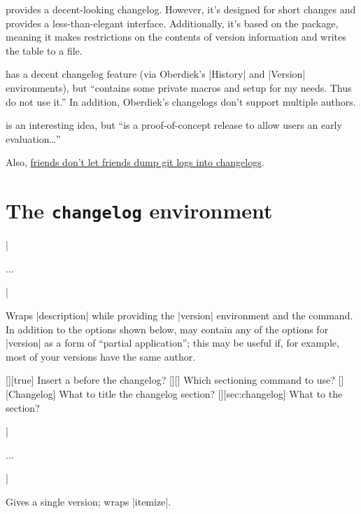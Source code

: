 \documentclass{ltxguidex}
\begin{document}
\begin{ctandescription}
	 provides a decent-looking changelog. However, it's
		designed for short changes and provides a less-than-elegant
		interface. Additionally, it's based on the 
		package, meaning it makes restrictions on the contents of
		version information and writes the table to a file.

	 has a decent changelog feature (via
		Oberdiek's |History| and |Version| environments),
		but  ``contains some private macros and setup
		for my needs. Thus do not use it.'' In addition, Oberdiek's
		changelogs don't support multiple authors.

	 is an interesting idea, but  ``is a
		proof-of-concept release to allow users an early
		evaluation\dots''

		Also,
		\href{https://keepachangelog.com/en/1.0.0/}{friends don't
		let friends dump git logs into changelogs}.
\end{ctandescription}

\section{The \texttt{changelog} environment}

\begin{desc}
|\begin{changelog}[<options>]...\end{changelog}|
\end{desc}
Wraps |description| while providing the |version| environment and the
 command. In addition to the options shown below,
 may contain any of the options for |version| as a form of
``partial application''; this may be useful if, for example, most of your
versions have the same author.

\begin{keys}
	[\bool][true]
		Insert a  before the changelog?
	[][]
		Which sectioning command to use?
	[][Changelog]
		What to title the changelog section?
	[][sec:changelog]
		What to  the section?
\end{keys}

\begin{desc}
|\begin{version}[<options>]...\end{version}|
\end{desc}
Gives a single version; wraps |itemize|.
\end{document}
